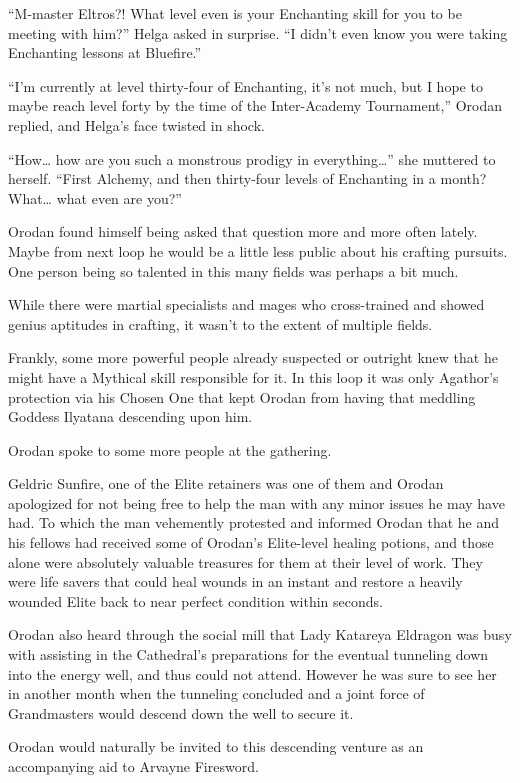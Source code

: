 \documentclass[a4paper,10pt]{book}
\begin{document}
“M-master Eltros?! What level even is your Enchanting skill for you to be meeting with him?” Helga asked in surprise. “I didn’t even know you were taking Enchanting lessons at Bluefire.”\par
“I’m currently at level thirty-four of Enchanting, it’s not much, but I hope to maybe reach level forty by the time of the Inter-Academy Tournament,” Orodan replied, and Helga’s face twisted in shock.\par
“How… how are you such a monstrous prodigy in everything…” she muttered to herself. “First Alchemy, and then thirty-four levels of Enchanting in a month? What… what even are you?”\par
Orodan found himself being asked that question more and more often lately. Maybe from next loop he would be a little less public about his crafting pursuits. One person being so talented in this many fields was perhaps a bit much.\par
While there were martial specialists and mages who cross-trained and showed genius aptitudes in crafting, it wasn’t to the extent of multiple fields.\par
Frankly, some more powerful people already suspected or outright knew that he might have a Mythical skill responsible for it. In this loop it was only Agathor’s protection via his Chosen One that kept Orodan from having that meddling Goddess Ilyatana descending upon him.\par
Orodan spoke to some more people at the gathering.\par
Geldric Sunfire, one of the Elite retainers was one of them and Orodan apologized for not being free to help the man with any minor issues he may have had. To which the man vehemently protested and informed Orodan that he and his fellows had received some of Orodan’s Elite-level healing potions, and those alone were absolutely valuable treasures for them at their level of work. They were life savers that could heal wounds in an instant and restore a heavily wounded Elite back to near perfect condition within seconds.\par
Orodan also heard through the social mill that Lady Katareya Eldragon was busy with assisting in the Cathedral’s preparations for the eventual tunneling down into the energy well, and thus could not attend. However he was sure to see her in another month when the tunneling concluded and a joint force of Grandmasters would descend down the well to secure it.\par
Orodan would naturally be invited to this descending venture as an accompanying aid to Arvayne Firesword.\par
\end{document}
